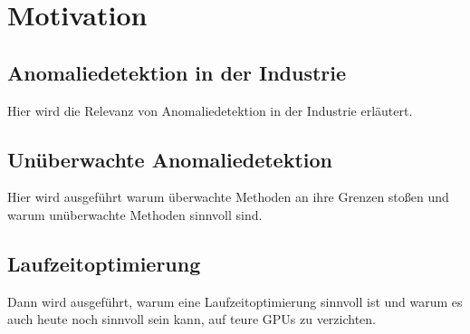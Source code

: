 
\chapter{Motivation}
\label{ch:Motivation}
\section{Anomaliedetektion in der Industrie}
\label{sec:AnomaliedetektionIndustrie}
Hier wird die Relevanz von Anomaliedetektion in der Industrie erläutert.\
\section{Unüberwachte Anomaliedetektion}
\label{sec:UnüberwachteAnomaliedetektion}
Hier wird ausgeführt warum überwachte Methoden an ihre Grenzen stoßen und warum unüberwachte Methoden sinnvoll sind.\
\section{Laufzeitoptimierung}
\label{sec:Laufzeitoptimierung}
Dann wird ausgeführt, warum eine Laufzeitoptimierung sinnvoll ist und warum es auch heute noch sinnvoll sein kann, auf teure GPUs zu verzichten.\
